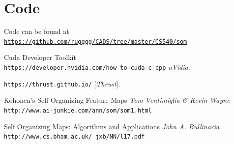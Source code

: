 \documentclass[11pt]{article}
\begin{document}
\section{Code}

Code can be found at \texttt{\href{https://github.com/rugggg/CADS/tree/master/CS540/nBody}{https://github.com/rugggg/CADS/tree/master/CS540/som}}

\begin{thebibliography}{9}
Cuda Developer Toolkit
\\\texttt{https://developer.nvidia.com/how-to-cuda-c-cpp}
\textit{nVidia}. 
 
\texttt{https://thrust.github.io/}
[\textit{Thrust}]. 

 
Kohonen's Self Organizing Feature Maps
\textit{Tom Ventimiglia \& Kevin Wayne}
\\\texttt{http://www.ai-junkie.com/ann/som/som1.html}

Self Organizing Maps: Algorithms and Applications
\textit{John A. Bullinaria}
\\\texttt{http://www.cs.bham.ac.uk/~jxb/NN/l17.pdf}
\end{thebibliography}
\end{document}
